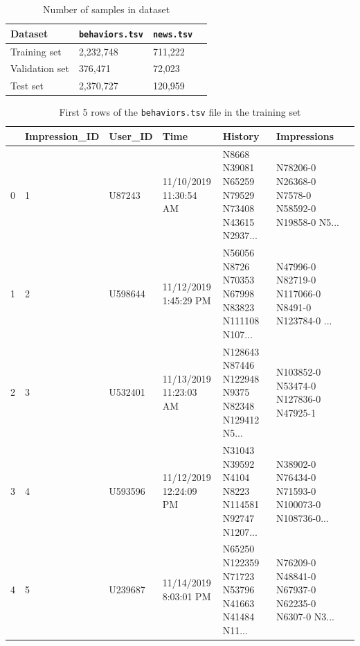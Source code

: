 \documentclass[9pt,twocolumn,twoside,lineno]{gsajnl}
\begin{document}
\begin{table}[p]
\centering
\caption{Number of samples in dataset}
\begin{tableminipage}{\textwidth}
\begin{tabularx}{\textwidth}{@{}XXXX@{}}
\hline
{\bf Dataset} & {\bf \texttt{behaviors.tsv}} & {\bf \texttt{news.tsv}} \\
\hline
Training set &	2,232,748  &	711,222\\
Validation set &	376,471  &	72,023\\
Test set &	2,370,727  &	120,959\\
\hline
\end{tabularx}
  \label{tab:1}
\end{tableminipage}
\end{table}


\begin{table}[p]
\centering
\caption{First 5 rows of the \texttt{behaviors.tsv} ﬁle in the training set}
\begin{tableminipage}{\textwidth}
\begin{tabularx}{\textwidth}{@{}cXXXXXX@{}}
\hline
{} & {\bf Impression\_ID} & {\bf User\_ID} & {\bf Time} & {\bf History} & {\bf Impressions} \\
\hline
0 & 1 & U87243 & 11/10/2019 11:30:54 AM & N8668 N39081 N65259 N79529 N73408 N43615 N2937... & N78206-0 N26368-0 N7578-0 N58592-0 N19858-0 N5...\\
1 & 2 & U598644 & 11/12/2019 1:45:29 PM & N56056 N8726 N70353 N67998 N83823 N111108 N107... & N47996-0 N82719-0 N117066-0 N8491-0 N123784-0 ...\\
2 & 3 & U532401 & 11/13/2019 11:23:03 AM & N128643 N87446 N122948 N9375 N82348 N129412 N5... & N103852-0 N53474-0 N127836-0 N47925-1\\
3 & 4 & U593596 & 11/12/2019 12:24:09 PM & N31043 N39592 N4104 N8223 N114581 N92747 N1207... & N38902-0 N76434-0 N71593-0 N100073-0 N108736-0...\\
4 & 5 & U239687 & 11/14/2019 8:03:01 PM & N65250 N122359 N71723 N53796 N41663 N41484 N11... & N76209-0 N48841-0 N67937-0 N62235-0 N6307-0 N3...\\
\hline
\end{tabularx}
  \label{tab:2}
\end{tableminipage}
\end{table}
\end{document}
